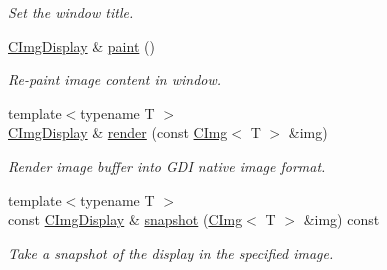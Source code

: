 \begin{DoxyCompactItemize}
\begin{DoxyCompactList}\small\item\em Set the window title. \end{DoxyCompactList}\item 
\hypertarget{structcimg__library_1_1_c_img_display_a08906b39cd55a8b5f0d52112ba635935}{\hyperlink{structcimg__library_1_1_c_img_display}{C\-Img\-Display} \& \hyperlink{structcimg__library_1_1_c_img_display_a08906b39cd55a8b5f0d52112ba635935}{paint} ()}\label{structcimg__library_1_1_c_img_display_a08906b39cd55a8b5f0d52112ba635935}

\begin{DoxyCompactList}\small\item\em Re-\/paint image content in window. \end{DoxyCompactList}\item 
\hypertarget{structcimg__library_1_1_c_img_display_a5bfdd6fed29e4c8f918a10cd125ec84f}{{\footnotesize template$<$typename T $>$ }\\\hyperlink{structcimg__library_1_1_c_img_display}{C\-Img\-Display} \& \hyperlink{structcimg__library_1_1_c_img_display_a5bfdd6fed29e4c8f918a10cd125ec84f}{render} (const \hyperlink{structcimg__library_1_1_c_img}{C\-Img}$<$ T $>$ \&img)}\label{structcimg__library_1_1_c_img_display_a5bfdd6fed29e4c8f918a10cd125ec84f}

\begin{DoxyCompactList}\small\item\em Render image buffer into G\-D\-I native image format. \end{DoxyCompactList}\item 
\hypertarget{structcimg__library_1_1_c_img_display_a951e98c7d426911b27dadb95bb96885f}{{\footnotesize template$<$typename T $>$ }\\const \hyperlink{structcimg__library_1_1_c_img_display}{C\-Img\-Display} \& \hyperlink{structcimg__library_1_1_c_img_display_a951e98c7d426911b27dadb95bb96885f}{snapshot} (\hyperlink{structcimg__library_1_1_c_img}{C\-Img}$<$ T $>$ \&img) const }\label{structcimg__library_1_1_c_img_display_a951e98c7d426911b27dadb95bb96885f}

\begin{DoxyCompactList}\small\item\em Take a snapshot of the display in the specified image. \end{DoxyCompactList}\end{DoxyCompactItemize}
